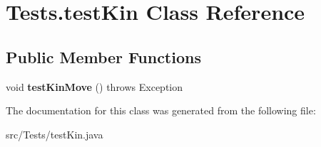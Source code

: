 \hypertarget{class_tests_1_1test_kin}{}\section{Tests.\+test\+Kin Class Reference}
\label{class_tests_1_1test_kin}
\subsection*{Public Member Functions}
\begin{DoxyCompactItemize}
\item 
\mbox{\label{class_tests_1_1test_kin_a16d9c789050f127072276d041617d3ac}} 
void {\bfseries test\+Kin\+Move} ()  throws Exception
\end{DoxyCompactItemize}


The documentation for this class was generated from the following file\+:\begin{DoxyCompactItemize}
\item 
src/\+Tests/test\+Kin.\+java\end{DoxyCompactItemize}
